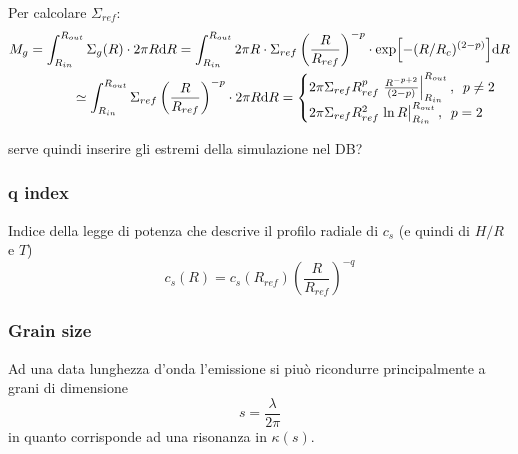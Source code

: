 \documentclass[DIN, pagenumber=false, fontsize=11pt, parskip=half]{scrartcl}
\begin{document}
\begin{center}
\end{center}
Per calcolare $\Sigma_{ref}$:
\begin{align}
 M_g = \int_{R_{in}}^{R_{out}} \Sigma_g(R) \cdot 2  \pi R \dd R =\int_{R_{in}}^{R_{out}} 2  \pi R \cdot \Sigma_{ref} \left( \frac{R}{R_{ref}}\right)^{-p} \cdot 
 \exp[-(R/R_c)^{(2-p)}] \dd R \\
 \simeq \int_{R_{in}}^{R_{out}} \Sigma_{ref} \left( \frac{R}{R_{ref}}\right)^{-p} \cdot 2  \pi R \dd R =  \begin{cases}
                        2 \pi \Sigma_{ref}R_{ref}^{p} \eval{\frac{R^{-p+2}}{(2-p)}}_{R_{in}}^{R_{out}} , \hspace{5pt} p \neq 2 \\
                        2 \pi \Sigma_{ref}R_{ref}^{2} \eval{\ln R}_{R_{in}}^{R_{out}} , \hspace{5pt} p = 2 \\
\end{cases}
\end{align}

serve quindi inserire gli estremi della simulazione nel DB?


\subsubsection{q index}
\label{qind}
Indice della legge di potenza che descrive il profilo radiale di $c_s$ (e quindi di $H/R$ e $T$)
\begin{equation}
 c_s(R) = c_s(R_{ref}) \left(\frac{R}{R_{ref}} \right)^{-q}
\end{equation}

\subsubsection{Grain size}
\label{grainsize}

Ad una data lunghezza d'onda l'emissione si piuò ricondurre principalmente a grani di dimensione
\begin{equation}
 s = \frac{\lambda}{2\pi}
\end{equation}
in quanto corrisponde ad una risonanza in $\kappa(s)$.
\end{document}
